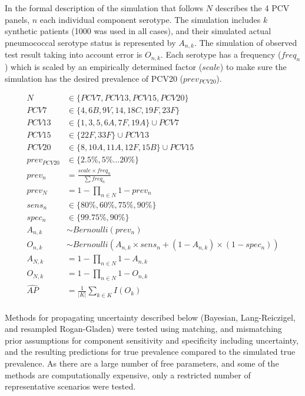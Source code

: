 \documentclass[a4paper, 12pt, twoside]{article}
\begin{document}
In the formal description of the simulation that follows \(N\) describes the 4 PCV panels, \(n\) each individual component serotype. The simulation includes \(k\) synthetic patients (1000 was used in all cases), and their simulated actual pneumococcal serotype status is represented by \(A_{n,k}\). The simulation of observed test result taking into account error is \(O_{n,k}\). Each serotype has a frequency (\(freq_n\)) which is scaled by an empirically determined factor (\(scale\)) to make sure the simulation has the desired prevalence of PCV20 (\(prev_{PCV20}\)).

\begin{equation*}
\begin{aligned}
N &\in \{PCV7, PCV13, PCV15, PCV20\} \\
PCV7 &\in \{4, 6B, 9V, 14, 18C, 19F, 23F\} \\
PCV13 &\in \{1, 3, 5, 6A, 7F, 19A\} \cup PCV7 \\
PCV15 &\in \{22F, 33F\} \cup PCV13\\
PCV20 &\in \{8, 10A, 11A, 12F, 15B\} \cup PCV15\\
prev_{PCV20} &\in \{2.5\%, 5\% \dots 20\% \}  \\
prev_n &= \frac{scale \times freq_n}{\sum{freq_n}} \\
prev_N &= 1-\prod_{n \in N}{1-prev_n} \\
sens_n &\in \{80\%, 60\%, 75\%, 90\% \}  \\
spec_n &\in \{99.75\%,90\% \} \\
A_{n,k} &\sim Bernoulli(prev_n) \\
O_{n,k} &\sim Bernoulli(A_{n,k} \times sens_n + (1-A_{n,k}) \times (1-spec_n)) \\
A_{N,k} &= 1-\prod_{n \in N}{1-A_{n,k}} \\
O_{N,k} &= 1-\prod_{n \in N}{1-O_{n,k}} \\
\widehat{AP} &= \frac{1}{|K|}\sum_{k \in K}{I(O_{k})} \\
\end{aligned}
\end{equation*}

Methods for propagating uncertainty described below (Bayesian, Lang-Reiczigel, and resampled Rogan-Gladen) were tested using matching, and mismatching prior assumptions for component sensitivity and specificity including uncertainty, and the resulting predictions for true prevalence compared to the simulated true prevalence. As there are a large number of free parameters, and some of the methods are computationally expensive, only a restricted number of representative scenarios were tested.
\end{document}
